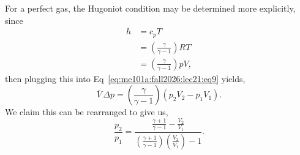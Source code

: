 \begin{node}
For a perfect gas, the Hugoniot condition may be determined more
explicitly, since
\begin{subequations}
  \begin{align}
h &= c_{p}T \\
&=\left(\frac{\gamma}{\gamma-1}\right)RT\\
&=\left(\frac{\gamma}{\gamma-1}\right)pV,
  \end{align}
\end{subequations}
then plugging this into Eq~\eqref{eq:me101a:fall2026:lec21:eq9} yields,
\begin{equation}\label{eq:me101a:fall2026:lec21:hugoniot-for-perfect-gas-eq0}
  \overline{V}\,\Delta p=\left(\frac{\gamma}{\gamma-1}\right)(p_{2}V_{2}-p_{1}V_{1}).
\end{equation}
We claim this can be rearranged to give us,
\begin{equation}\label{eq:me101a:fall2026:lec21:hugoniot-for-perfect-gas}
\boxed{\frac{p_{2}}{p_{1}}=\frac{\displaystyle{\frac{\gamma+1}{\gamma-1}-\frac{V_{2}}{V_{1}}}}{\displaystyle{\left(\frac{\gamma+1}{\gamma-1}\right)\left(\frac{V_{2}}{V_{1}}\right)-1}}.}
\end{equation}
\end{node}

